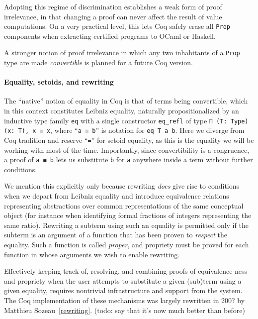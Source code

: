 \documentclass[a4paper,10pt,runningheads]{llncs}
\begin{document}
Adopting this regime of discrimination establishes a weak form of proof irrelevance, in that changing a proof can never affect the result of value computations. On a very practical level, this lets Coq safely erase all \lstinline|Prop| components when extracting certified programs to OCaml or Haskell.

A stronger notion of proof irrelevance in which any two inhabitants of a \lstinline|Prop| type are made \emph{convertible} is planned for a future Coq version.


\paragraph{Equality, setoids, and rewriting}

The ``native'' notion of equality in Coq is that of terms being convertible, which in this context constitutes Leibniz equality, naturally propositionalized by an inductive type family \lstinline|eq| with a single constructor \lstinline|eq_refl| of type \lstinline|Π (T: Type) (x: T), x ≡ x|, where ``\lstinline|a ≡ b|'' is notation for \lstinline|eq T a b|. Here we diverge from Coq tradition and reserve ``\lstinline|=|'' for setoid equality, as this is the equality we will be working with most of the time. Importantly, since convertibility is a congruence, a proof of \lstinline|a ≡ b| lets us substitute \lstinline|b| for \lstinline|a| anywhere inside a term without further conditions.

We mention this explicitly only because rewriting \emph{does} give rise to conditions when we depart from Leibniz equality and introduce equivalence relations representing abstractions over common representations of the same conceptual object (for instance when identifying formal fractions of integers representing the same ratio). Rewriting a subterm using such an equality is permitted only if the subterm is an argument of a function that has been proven to \emph{respect} the equality. Such a function is called \emph{proper}, and propriety must be proved for each function in whose arguments we wish to enable rewriting.

Effectively keeping track of, resolving, and combining proofs of equivalence-ness and propriety when the user attempts to substitute a given (sub)term using a given equality, requires nontrivial infrastructure and support from the system. The Coq implementation of these mechanisms was largely rewritten in 200? by Matthieu Sozeau~\ref{rewriting}. (todo: say that it's now much better than before)
\end{document}
